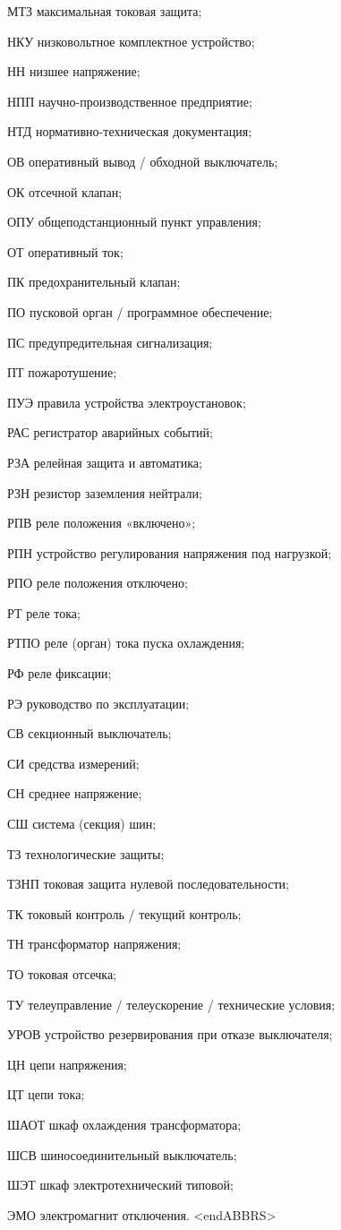 \begin{list}{}
\item[МТЗ] максимальная токовая защита;
\item[НКУ] низковольтное комплектное устройство;
\item[НН] низшее напряжение;
\item[НПП] научно-производственное предприятие;
\item[НТД] нормативно-техническая документация;
\item[ОВ] оперативный вывод / обходной выключатель;
\item[ОК] отсечной клапан;
\item[ОПУ] общеподстанционный пункт управления;
\item[ОТ] оперативный ток;
\item[ПК] предохранительный клапан;
\item[ПО] пусковой орган / программное обеспечение;
\item[ПС] предупредительная сигнализация;
\item[ПТ] пожаротушение;
\item[ПУЭ] правила устройства электроустановок;
\item[РАС] регистратор аварийных событий;
\item[РЗА] релейная защита и автоматика;
\item[РЗН] резистор заземления нейтрали;
\item[РПВ] реле положения «включено»;
\item[РПН] устройство регулирования напряжения под нагрузкой;
\item[РПО] реле положения отключено;
\item[РТ] реле тока;
\item[РТПО] реле (орган) тока пуска охлаждения;
\item[РФ] реле фиксации;
\item[РЭ] руководство по эксплуатации;
\item[СВ] секционный выключатель;
\item[СИ] средства измерений;
\item[СН] среднее напряжение;
\item[СШ] система (секция) шин;
\item[ТЗ] технологические защиты;
\item[ТЗНП] токовая защита нулевой последовательности;
\item[ТК] токовый контроль / текущий контроль;
\item[ТН] трансформатор напряжения;
\item[ТО] токовая отсечка;
\item[ТУ] телеуправление / телеускорение / технические условия;
\item[УРОВ] устройство резервирования при отказе выключателя;
\item[ЦН] цепи напряжения;
\item[ЦТ] цепи тока;
\item[ШАОТ] шкаф охлаждения трансформатора;
\item[ШСВ] шиносоединительный выключатель;
\item[ШЭТ] шкаф электротехнический типовой;
\item[ЭМО] электромагнит отключения.
{\color{white}\fontsize{0.1pt}{0.1pt}\selectfont<endABBRS>}
\end{list}
